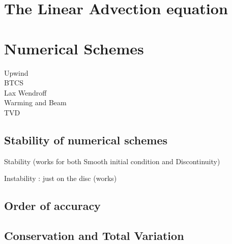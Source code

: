 \documentclass[11pt,a4paper]{article}
\begin{document}
\section{The Linear Advection equation}

\section{Numerical Schemes}
Upwind \\
BTCS\\
Lax Wendroff\\
Warming and Beam \\
TVD \\

\subsection{Stability of numerical schemes}
Stability (works for both Smooth initial condition and
Discontinuity) 

Instability : just on the disc (works)

\subsection{Order of accuracy}

\subsection{Conservation and Total Variation}
\end{document}
